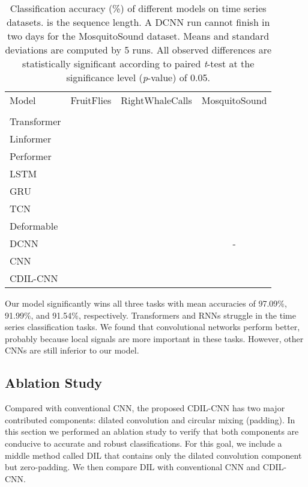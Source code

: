 \documentclass{article}
\begin{document}
\begin{table}[tb]
\centering
\caption{Classification accuracy (\%) of different models on time series datasets.  is the sequence length. A DCNN run cannot finish in two days for the MosquitoSound dataset. Means and standard deviations are computed by 5 runs. All observed differences are statistically significant according to paired \textit{t}-test at the significance level (\textit{p}-value) of 0.05.}
\label{table:time}
\renewcommand{\arraystretch}{1.2}
\begin{tabular}{lccc}
\hline
\hline
Model       &FruitFlies   &RightWhaleCalls    &MosquitoSound   \\
            &     &           &       \\
\hline
Transformer     &      &       &       \\
\hline
Linformer       &       &       &       \\
\hline
Performer       &      &       &       \\
\hline
LSTM            &       &       &       \\
\hline
GRU             &     &       &       \\
\hline
TCN             &      &       &       \\
\hline
Deformable      &       &        &       \\
\hline
DCNN            &      &       & -       \\
\hline
CNN             &       &       &       \\
\hline
CDIL-CNN        &    &    &      \\
\hline
\hline
\end{tabular}
\end{table}

Our model significantly wins all three tasks with mean accuracies of 97.09\%, 91.99\%, and 91.54\%, respectively. Transformers and RNNs struggle in the time series classification tasks. We found that convolutional networks perform better, probably because local signals are more important in these tasks. However, other CNNs are still inferior to our model.

\subsection{Ablation Study}
\label{subsec:ablation}

Compared with conventional CNN, the proposed CDIL-CNN has two major contributed components: dilated convolution and circular mixing (padding). In this section we performed an ablation study to verify that both components are conducive to accurate and robust classifications. For this goal, we include a middle method called DIL that contains only the dilated convolution component but zero-padding. We then compare DIL with conventional CNN and CDIL-CNN.
\end{document}
